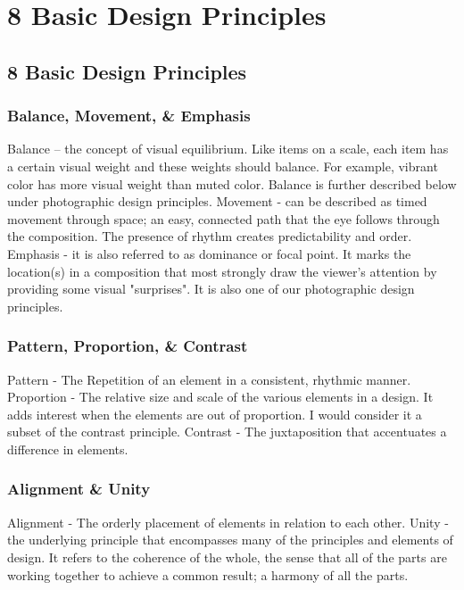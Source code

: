 \documentclass{beamer}
\begin{document}
\begin{frame}
\begin{columns}
				\end{columns}
			\end{frame}

		\section{8 Basic Design Principles}
\subsection{8 Basic Design Principles}		
\begin{frame}
	\frametitle{Balance, Movement, \& Emphasis}
		\begin{outline}
			\1 Balance – 
			\2 the concept of visual equilibrium. Like items on a scale, each item has a certain visual weight and these weights should balance. For example, vibrant color has more visual weight than muted color. Balance is further described below under photographic design principles.
			\1 Movement - 
			\2 can be described as timed movement through space; an easy, connected path that the eye follows through the composition. The presence of rhythm creates predictability and order.
			\1 Emphasis - 
			\2 it is also referred to as dominance or focal point. It marks the location(s) in a composition that most strongly draw the viewer's attention by providing some visual "surprises". It is also one of our photographic design principles.
		\end{outline}
\end{frame}

\begin{frame}
	\frametitle{Pattern, Proportion, \& Contrast}
	\begin{outline}
		\1 Pattern - 
		\2 The Repetition of an element in a consistent, rhythmic manner.
		\1 Proportion - 
		\2 The relative size and scale of the various elements in a design. It adds interest when the elements are out of proportion. I would consider it a subset of the contrast principle.
		\1 Contrast - 
		\2 The juxtaposition that accentuates a difference in elements.
	\end{outline}
\end{frame}

\begin{frame}
	\frametitle{Alignment \& Unity}
	\begin{outline}
		\1 Alignment - 
		\2 The orderly placement of elements in relation to each other.
		\1 Unity - 
		\2 the underlying principle that encompasses many of the principles and elements of design. It refers to the coherence of the whole, the sense that all of the parts are working together to achieve a common result; a harmony of all the parts.
	\end{outline}
\end{frame}
\end{document}
